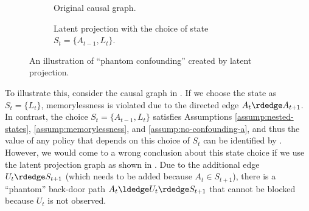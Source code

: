\documentclass[12pt,a4paper]{article}
\theoremstyle{definition}
\begin{document}
\begin{figure}[t]
  \centering
  \begin{subfigure}[b]{\textwidth}
      \centering
    \caption{Original causal graph.}
  \label{fig:rl_original_graph}
  \end{subfigure}

  \begin{subfigure}[b]{\textwidth}
      \centering
      \caption{Latent projection with the choice of state $S_t =
        \{A_{t-1},L_{t}\}$.}
  \label{fig:wrong_projection}
  \end{subfigure}

  \caption{An illustration of ``phantom confounding'' created by latent projection.}
  \label{fig:phantom}
\end{figure}

To illustrate this, consider the causal graph in
. If we choose the state as $S_t =
\{L_t\}$, memorylessness is violated due to the directed edge $A_t
\rdedge A_{t+1}$. In contrast, the choice $S_t = \{A_{t-1}, L_t\}$ satisfies
Assumptions \ref{assump:nested-states}, \ref{assump:memorylessness},
and \ref{assump:no-confounding-a}, and thus the value of any policy that
depends on this choice of $S_t$ can be identified by
. However, we would come to a wrong conclusion
about this state choice if we use the latent projection graph as shown
in . Due to the additional edge $U_t \rdedge
S_{t+1}$ (which needs to be added because $A_t \in S_{t+1}$), there is
a ``phantom'' back-door path $A_t \ldedge U_t \rdedge S_{t+1}$ that
cannot be blocked because $U_t$ is not observed.
\end{document}
